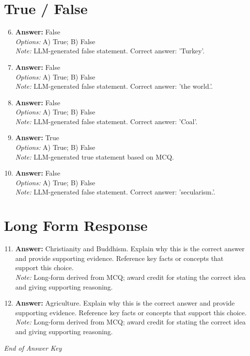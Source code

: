 \documentclass[12pt]{article}
\begin{document}
\section*{True / False}
\begin{enumerate}[label=\arabic*.]
\setcounter{enumi}{5}
\item \textbf{Answer:} False
\\ \textit{Options:} A) True; B) False
\\ \textit{Note:} LLM-generated false statement. Correct answer: 'Turkey'.
\item \textbf{Answer:} False
\\ \textit{Options:} A) True; B) False
\\ \textit{Note:} LLM-generated false statement. Correct answer: 'the world.'.
\item \textbf{Answer:} False
\\ \textit{Options:} A) True; B) False
\\ \textit{Note:} LLM-generated false statement. Correct answer: 'Coal'.
\item \textbf{Answer:} True
\\ \textit{Options:} A) True; B) False
\\ \textit{Note:} LLM-generated true statement based on MCQ.
\item \textbf{Answer:} False
\\ \textit{Options:} A) True; B) False
\\ \textit{Note:} LLM-generated false statement. Correct answer: 'secularism.'.
\end{enumerate}

\section*{Long Form Response}
\begin{enumerate}[label=\arabic*.]
\setcounter{enumi}{10}
\item \textbf{Answer:} Christianity and Buddhism. Explain why this is the correct answer and provide supporting evidence. Reference key facts or concepts that support this choice.
\\ \textit{Note:} Long-form derived from MCQ; award credit for stating the correct idea and giving supporting reasoning.
\item \textbf{Answer:} Agriculture. Explain why this is the correct answer and provide supporting evidence. Reference key facts or concepts that support this choice.
\\ \textit{Note:} Long-form derived from MCQ; award credit for stating the correct idea and giving supporting reasoning.
\end{enumerate}

\vfill
\noindent\textit{End of Answer Key}
\end{document}
